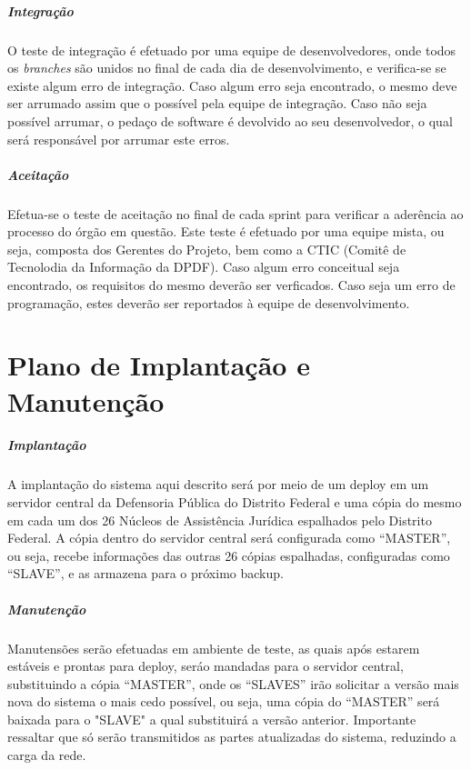 \documentclass[12pt,a4paper]{report}
\begin{document}
\paragraph{Integração} O teste de integração é efetuado por uma equipe de desenvolvedores, onde todos os \textit{branches} são unidos no final de cada dia de desenvolvimento, e verifica-se se existe algum erro de integração. Caso algum erro seja encontrado, o mesmo deve ser arrumado assim que o possível pela equipe de integração. Caso não seja possível arrumar, o pedaço de software é devolvido ao seu desenvolvedor, o qual será responsável por arrumar este erros.

\paragraph{Aceitação} Efetua-se o teste de aceitação no final de cada sprint para verificar a aderência ao processo do órgão em questão. Este teste é efetuado por uma equipe mista, ou seja, composta dos Gerentes do Projeto, bem como a CTIC (Comitê de Tecnolodia da Informação da DPDF). Caso algum erro conceitual seja encontrado, os requisitos do mesmo deverão ser verficados. Caso seja um erro de programação, estes deverão ser reportados à equipe de desenvolvimento.

\chapter{Plano de Implantação e Manutenção}
\paragraph{Implantação} A implantação do sistema aqui descrito será por meio de um deploy em um servidor central da Defensoria Pública do Distrito Federal e uma cópia do mesmo em cada um dos 26 Núcleos de Assistência Jurídica espalhados pelo Distrito Federal. A cópia dentro do servidor central será configurada como ``MASTER'', ou seja, recebe informações das outras 26 cópias espalhadas, configuradas como ``SLAVE'', e as armazena para o próximo backup.

\paragraph{Manutenção} Manutensões serão efetuadas em ambiente de teste, as quais após estarem estáveis e prontas para deploy, seráo mandadas para o servidor central, substituindo a cópia ``MASTER'', onde os ``SLAVES'' irão solicitar a versão mais nova do sistema o mais cedo possível, ou seja, uma cópia do ``MASTER'' será baixada para o "SLAVE" a qual substituirá a versão anterior. Importante ressaltar que só serão transmitidos as partes atualizadas do sistema, reduzindo a carga da rede.
\end{document}
